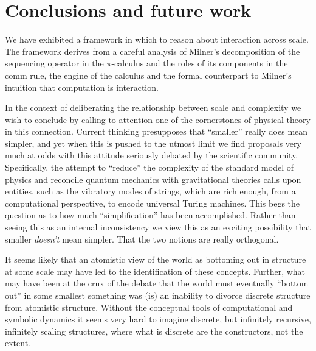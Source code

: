 \section{Conclusions and future work}

We have exhibited a framework in which to reason about interaction
across scale. The framework derives from a careful analysis of
Milner's decomposition of the sequencing operator in the
$\pi$-calculus and the roles of its components in the comm rule, the
engine of the calculus and the formal counterpart to Milner's
intuition that computation is interaction.

In the context of deliberating the relationship between scale and
complexity we wish to conclude by calling to attention one of the
cornerstones of physical theory in this connection. Current thinking
presupposes that ``smaller'' really does mean simpler, and yet when
this is pushed to the utmost limit we find proposals very much at odds
with this attitude seriously debated by the scientific
community. Specifically, the attempt to ``reduce'' the complexity of
the standard model of physics and reconcile quantum mechanics with
gravitational theories calls upon entities, such as the vibratory
modes of strings, which are rich enough, from a computational
perspective, to encode universal Turing machines. This begs the
question as to how much ``simplification'' has been
accomplished. Rather than seeing this as an internal inconsistency we
view this as an exciting possibility that smaller \emph{doesn't} mean
simpler. That the two notions are really orthogonal.

It seems likely that an atomistic view of the world as bottoming out
in structure at some scale may have led to the identification of these
concepts. Further, what may have been at the crux of the debate that
the world must eventually ``bottom out'' in some smallest something
was (is) an inability to divorce discrete structure from atomistic
structure. Without the conceptual tools of computational and symbolic
dynamics it seems very hard to imagine discrete, but infinitely
recursive, infinitely scaling structures, where what is discrete are
the constructors, not the extent.



